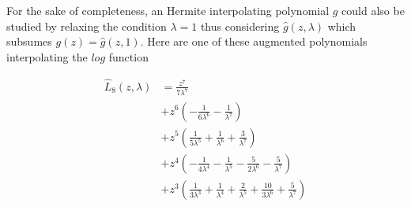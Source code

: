 \begin{remark}
For the sake of completeness, an Hermite interpolating polynomial $g$ could
also be studied by relaxing the condition $\lambda=1$ thus considering
$\hat{g}(z,\lambda)$ which subsumes $g(z)=\hat{g}(z,1)$. Here are one of these
augmented polynomials interpolating the $log$ function
\iffalse
\begin{displaymath}
\begin{split}
\hat{I}_{8}{\left (z, \lambda \right )} &= - \frac{z^{7}}{\lambda^{8}} \\
&+ z^{6} \left(\frac{1}{\lambda^{7}} + \frac{7}{\lambda^{8}}\right) \\
&+ z^{5} \left(- \frac{1}{\lambda^{6}} - \frac{6}{\lambda^{7}} - \frac{21}{\lambda^{8}}\right) \\
&+ z^{4} \left(\frac{1}{\lambda^{5}} + \frac{5}{\lambda^{6}} + \frac{15}{\lambda^{7}} + \frac{35}{\lambda^{8}}\right) \\
&+ z^{3} \left(- \frac{1}{\lambda^{4}} - \frac{4}{\lambda^{5}} - \frac{10}{\lambda^{6}} - \frac{20}{\lambda^{7}} - \frac{35}{\lambda^{8}}\right) \\
&+ z^{2} \left(\frac{1}{\lambda^{3}} + \frac{3}{\lambda^{4}} + \frac{6}{\lambda^{5}} + \frac{10}{\lambda^{6}} + \frac{15}{\lambda^{7}} + \frac{21}{\lambda^{8}}\right) \\
&+ z \left(- \frac{1}{\lambda^{2}} - \frac{2}{\lambda^{3}} - \frac{3}{\lambda^{4}} - \frac{4}{\lambda^{5}} - \frac{5}{\lambda^{6}} - \frac{6}{\lambda^{7}} - \frac{7}{\lambda^{8}}\right) \\
&+ \frac{1}{\lambda} + \frac{1}{\lambda^{2}} + \frac{1}{\lambda^{3}} + \frac{1}{\lambda^{4}} + \frac{1}{\lambda^{5}} + \frac{1}{\lambda^{6}} + \frac{1}{\lambda^{7}} + \frac{1}{\lambda^{8}}
\end{split}
\end{displaymath}
and
\fi
\begin{displaymath}
\begin{split}
\hat{L}_{8}{\left (z,\lambda \right )} &= \frac{z^{7}}{7 \lambda^{7}} \\
&+ z^{6} \left(- \frac{1}{6 \lambda^{6}} - \frac{1}{\lambda^{7}}\right) \\
&+ z^{5} \left(\frac{1}{5 \lambda^{5}} + \frac{1}{\lambda^{6}} + \frac{3}{\lambda^{7}}\right) \\
&+ z^{4} \left(- \frac{1}{4 \lambda^{4}} - \frac{1}{\lambda^{5}} - \frac{5}{2 \lambda^{6}} - \frac{5}{\lambda^{7}}\right) \\
&+ z^{3} \left(\frac{1}{3 \lambda^{3}} + \frac{1}{\lambda^{4}} + \frac{2}{\lambda^{5}} + \frac{10}{3 \lambda^{6}} + \frac{5}{\lambda^{7}}\right) \\

\end{split}
\end{displaymath}
\end{remark}
